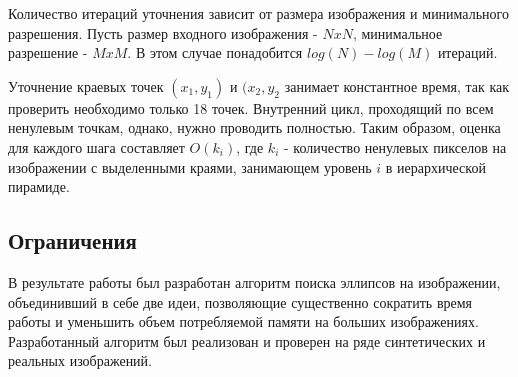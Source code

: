 Количество итераций уточнения зависит от размера изображения и минимального разрешения. Пусть размер входного изображения - \(N x N\), минимальное разрешение - \(M x M\).
В этом случае понадобится \(log(N) - log(M)\) итераций.

Уточнение краевых точек \((x_1,y_1)\) и \((x_2,y_2\) занимает константное время, так как проверить необходимо только 18 точек.
Внутренний цикл, проходящий по всем ненулевым точкам, однако, нужно проводить полностью. 
Таким образом, оценка для каждого шага составляет \(O(k_i)\), где \(k_i\) - количество ненулевых пикселов на изображении с выделенными краями, занимающем уровень \(i\) в иерархической пирамиде.

\subsection{Ограничения}

\Conc
В результате работы был разработан алгоритм поиска эллипсов на изображении, объединивший в себе две идеи, 
позволяющие существенно сократить время работы и уменьшить объем потребляемой памяти на больших изображениях.
Разработанный алгоритм был реализован и проверен на ряде синтетических и реальных изображений. 

\printbibliography[%
    heading=bibintoc%
]


